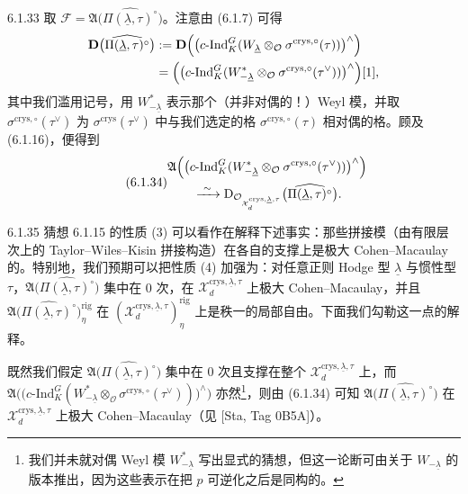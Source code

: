 \begin{rem}{6.1.33}
取 $\mathcal F=\mathfrak A\bigl(\widehat{\Pi(\underline\lambda,\tau)^\circ}\bigr)$。注意由 (6.1.7) 可得
\[
\begin{aligned}
\mathbf D\bigl(\widehat{\Pi(\underline\lambda,\tau)^\circ}\bigr)
&:=\mathbf D\Bigl(\bigl(c\text{-}\mathrm{Ind}_K^G(W_{\underline\lambda}
\otimes_{\mathcal O}\sigma^{\mathrm{crys},\circ}(\tau))\bigr)^\wedge\Bigr)\\
&=\Bigl(\bigl(c\text{-}\mathrm{Ind}_K^G(W^*_{-\underline\lambda}
\otimes_{\mathcal O}\sigma^{\mathrm{crys},\circ}(\tau^\vee))\bigr)^\wedge\Bigr)[1],
\end{aligned}
\]
其中我们滥用记号，用 $W^*_{-\underline\lambda}$ 表示那个（并非对偶的！）Weyl 模，并取 $\sigma^{\mathrm{crys},\circ}(\tau^\vee)$ 为 $\sigma^{\mathrm{crys}}(\tau^\vee)$ 中与我们选定的格 $\sigma^{\mathrm{crys},\circ}(\tau)$ 相对偶的格。顾及 (6.1.16)，便得到
\begin{equation}\tag{6.1.34}\label{eq:a4-6-1-34}
\begin{aligned}
&\mathfrak A\Bigl(\bigl(c\text{-}\mathrm{Ind}_K^G(W^*_{-\underline\lambda}
\otimes_{\mathcal O}\sigma^{\mathrm{crys},\circ}(\tau^\vee))\bigr)^\wedge\Bigr)\\
&\qquad\xrightarrow{\ \sim\ }
\mathrm{D}_{\mathcal O_{\mathcal X_d^{\mathrm{crys},\underline\lambda,\tau}}}
\bigl(\widehat{\Pi(\underline\lambda,\tau)^\circ}\bigr).
\end{aligned}
\end{equation}
\end{rem}

\begin{rem}{6.1.35}
猜想 6.1.15 的性质 (3) 可以看作在解释下述事实：那些拼接模（由有限层次上的 Taylor--Wiles--Kisin 拼接构造）在各自的支撑上是极大 Cohen--Macaulay 的。特别地，我们预期可以把性质 (4) 加强为：对任意正则 Hodge 型 $\underline\lambda$ 与惯性型 $\tau$，$\mathfrak A\bigl(\widehat{\Pi(\underline\lambda,\tau)^\circ}\bigr)$ 集中在 0 次，在 $\mathcal X_d^{\mathrm{crys},\underline\lambda,\tau}$ 上极大 Cohen--Macaulay，并且 $\mathfrak A\bigl(\widehat{\Pi(\underline\lambda,\tau)^\circ}\bigr)^{\mathrm{rig}}_\eta$ 在 $(\mathcal X_d^{\mathrm{crys},\underline\lambda,\tau})^{\mathrm{rig}}_\eta$ 上是秩一的局部自由。下面我们勾勒这一点的解释。
\end{rem}

既然我们假定 $\mathfrak A\bigl(\widehat{\Pi(\underline\lambda,\tau)^\circ}\bigr)$ 集中在 0 次且支撑在整个 $\mathcal X_d^{\mathrm{crys},\underline\lambda,\tau}$ 上，而 $\mathfrak A\bigl(\bigl(c\text{-}\mathrm{Ind}_K^G(W^*_{-\underline\lambda}\otimes_{\mathcal O}\sigma^{\mathrm{crys},\circ}(\tau^\vee))\bigr)^\wedge\bigr)$ 亦然\footnote{我们并未就对偶 Weyl 模 $W^*_{-\underline\lambda}$ 写出显式的猜想，但这一论断可由关于 $W_{-\underline\lambda}$ 的版本推出，因为这些表示在把 $p$ 可逆化之后是同构的。}，则由 (6.1.34) 可知 $\mathfrak A\bigl(\widehat{\Pi(\underline\lambda,\tau)^\circ}\bigr)$ 在 $\mathcal X_d^{\mathrm{crys},\underline\lambda,\tau}$ 上极大 Cohen--Macaulay（见 [Sta, Tag 0B5A]）。

